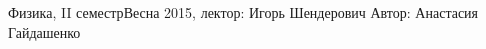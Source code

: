 


\BigHeader
	{Физика, II семестр}{Весна 2015, лектор: Игорь Шендерович}
	{Автор: Анастасия Гайдашенко}
	
 


